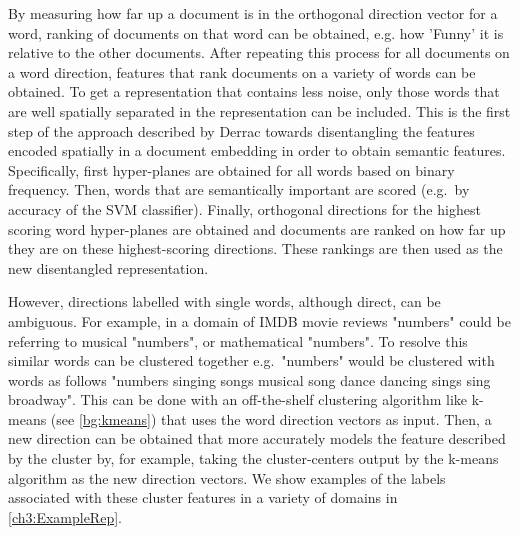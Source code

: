 By measuring how far up a document is in the orthogonal direction vector for a word, ranking of  documents on that word can be obtained, e.g. how 'Funny' it is relative to the other documents. After repeating this process for all documents on a word direction,  features that rank  documents on a variety of words can be obtained. To get a representation that contains less noise, only those words that are well spatially separated in the representation can be included. This is the first step of the approach described by Derrac \cite{Derrac2015} towards disentangling the features encoded spatially in a document embedding in order to obtain semantic features. Specifically, first  hyper-planes are obtained for all words based on binary frequency. Then,  words that are semantically important are scored (e.g.\ by accuracy of the SVM classifier). Finally, orthogonal directions for the highest scoring word hyper-planes are obtained and  documents are ranked on how far up they are on these highest-scoring directions. These rankings  are then used as the new disentangled representation.

However, directions labelled with single words, although direct, can be ambiguous. For example, in a domain of IMDB movie reviews "numbers" could be referring to musical "numbers", or mathematical "numbers".  To resolve this  similar words can be clustered together e.g.\  "numbers" would be clustered with words as follows  "numbers singing songs musical song dance dancing sings sing broadway". This can be done with an off-the-shelf clustering algorithm like k-means (see \ref{bg:kmeans}) that uses the word direction vectors as input. Then, a new direction can be obtained that more accurately models the feature described by the cluster by, for example, taking the cluster-centers output by the k-means algorithm as the new direction vectors.  We show examples of the labels associated with these cluster features  in a variety of domains in \ref{ch3:ExampleRep}. 
 
